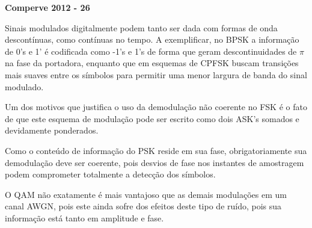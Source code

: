 \textbf{Comperve 2012 - 26}

Sinais modulados digitalmente podem tanto ser dada com formas de onda descontínuas, como contínuas no tempo. A exemplificar, no BPSK a informação de 0's e 1' é codificada como -1's e 1's de forma que geram descontinuidades de $\pi$ na fase da portadora, enquanto que em esquemas de CPFSK buscam transições mais suaves entre os símbolos para permitir uma menor largura de banda do sinal modulado.

Um dos motivos que justifica o uso da demodulação não coerente no FSK é o fato de que este esquema de modulação pode ser escrito como dois ASK's somados e devidamente ponderados.

Como o conteúdo de informação do PSK reside em sua fase, obrigatoriamente sua demodulação deve ser coerente, pois desvios de fase nos instantes de amostragem podem comprometer totalmente a detecção dos símbolos.

O QAM não exatamente é mais vantajoso que as demais modulações em um canal AWGN, pois este ainda sofre dos efeitos deste tipo de ruído, pois sua informação está tanto em amplitude e fase. 
